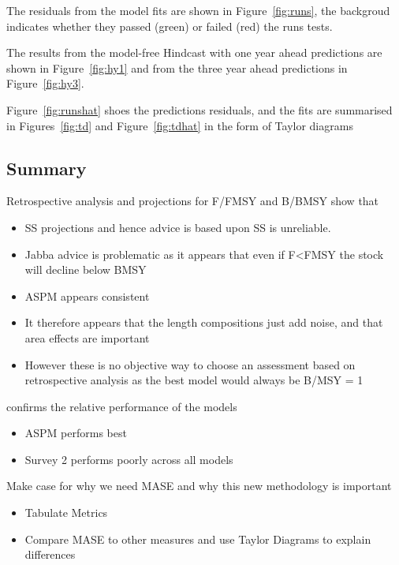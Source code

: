 \documentclass[a4paper]{article}
\begin{document}
The residuals from the model fits are shown in Figure~\ref{fig:runs}, the backgroud indicates whether they passed (green) or failed (red) the runs tests. 

The results from the model-free  Hindcast with one year ahead predictions are shown in Figure~\ref{fig:hy1} and from the three year ahead predictions in Figure~\ref{fig:hy3}.

Figure~\ref{fig:runshat} shoes the predictions residuals, and the fits are summarised in Figures~\ref{fig:td} and Figure~\ref{fig:tdhat} in the form of Taylor diagrams

\subsection*{Summary}

\begin{description}
    \item{Retrospective analysis and projections for F/FMSY and B/BMSY} show that
    \begin{itemize}
        \item SS projections and hence advice is based upon SS is unreliable.
        \item Jabba advice is problematic as it appears that even if F<FMSY the stock will decline below BMSY
        \item ASPM appears consistent
        \item It therefore appears that the length compositions just add noise, and that area effects are important
        \item However these is no objective way to choose an assessment based on retrospective analysis as the best model would always be B/MSY = 1 
        \end{itemize}
     confirms the relative performance of the models
    \begin{itemize}
        \item ASPM performs best
        \item Survey 2 performs poorly across all models
   \end{itemize}
   \item{Make case for why we need MASE and why this new methodology is important}
    \begin{itemize}
        \item Tabulate Metrics
        \item Compare MASE to other measures and use Taylor Diagrams to explain differences
   \end{itemize}

\end{description}
\end{document}
